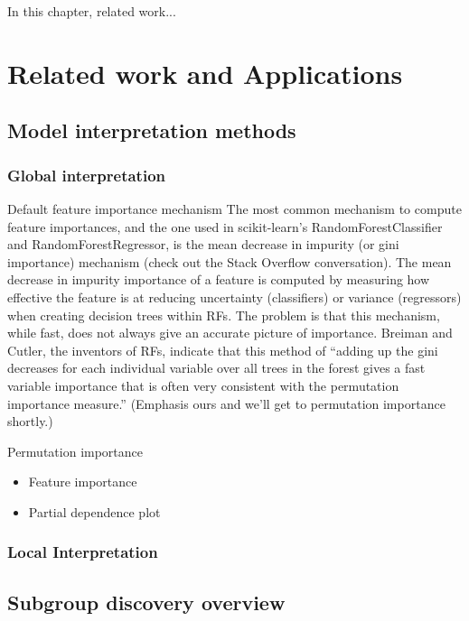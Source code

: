 In this chapter, related work... \cite{eli5}

\section{Related work and Applications}


\subsection{Model interpretation methods}

\subsubsection{Global interpretation}

Default feature importance mechanism
The most common mechanism to compute feature importances, and the one used in scikit-learn's RandomForestClassifier and RandomForestRegressor, is the mean decrease in impurity (or gini importance) mechanism (check out the Stack Overflow conversation). The mean decrease in impurity importance of a feature is computed by measuring how effective the feature is at reducing uncertainty (classifiers) or variance (regressors) when creating decision trees within RFs. The problem is that this mechanism, while fast, does not always give an accurate picture of importance. Breiman and Cutler, the inventors of RFs, indicate that this method of “adding up the gini decreases for each individual variable over all trees in the forest gives a fast variable importance that is often very consistent with the permutation importance measure.” (Emphasis ours and we'll get to permutation importance shortly.)

Permutation importance
\begin{itemize}
	\item Feature importance
	\item Partial dependence plot
\end{itemize}

\subsubsection{Local Interpretation}

\subsection{Subgroup discovery overview}

